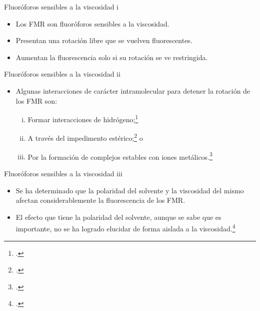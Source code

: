 \documentclass[%
spanish,
mexico]{beamer}
\begin{document}
\begin{frame}{Fluoróforos sensibles a la viscosidad i}
	\begin{itemize}[<+- | alert@+>]
		\item Los \gls{FMR} son fluoróforos sensibles a la viscosidad.
		\item Presentan una rotación libre que se vuelven fluorescentes.
		\item Aumentan la fluorescencia solo si su rotación se ve restringida.
	\end{itemize}
\end{frame}

\begin{frame}{Fluoróforos sensibles a la viscosidad ii}
	\begin{itemize}[<+- | alert@+>]
		\item Algunas interacciones de carácter intramolecular para detener la rotación de los \gls{FMR} son:
		      \begin{enumerate}[i.]
			      \item Formar interacciones de hidrógeno;\footcite{wuMultistageRotationalSpeed2018}
			      \item A través del impedimento estérico;\footcite{faulknerAllostericRegulationRotational2016} o
			      \item Por la formación de complejos estables con iones metálicos.\footcite{yadavViscochromicMechanochromicUnsymmetrical2019}
		      \end{enumerate}
	\end{itemize}
\end{frame}

\begin{frame}{Fluoróforos sensibles a la viscosidad iii}
	\begin{itemize}[<+- | alert@+>]
		\item Se ha determinado que la polaridad del solvente y la viscosidad del mismo afectan considerablemente la fluorescencia de los \gls{FMR}.
		\item El efecto que tiene la polaridad del solvente, aunque se sabe que es importante, no se ha logrado elucidar de forma aislada a la viscosidad.\footcite{haidekkerEffectsSolventPolarity2005}
	\end{itemize}
\end{frame}
\end{document}
